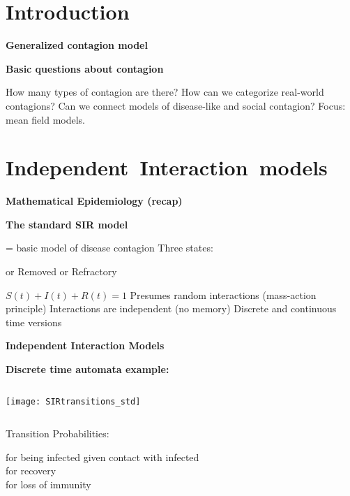 \section{Introduction}


  \textbf{Generalized contagion model}

  \textbf{Basic questions about contagion}
    
     How many types of contagion are there?
     How can we categorize real-world contagions?
     Can we connect models of disease-like and social contagion?
     \alert{Focus:} mean field models.
    
  


\section{Independent\ Interaction\ models}

  \textbf{Mathematical Epidemiology (recap)}

  \textbf{The standard \alert{SIR model}\cite{murray2002a}}
    
     = basic model of disease contagion
     Three states:
      
        { or Removed or Refractory}
      
       $S(t) + I(t) + R(t) = 1$
       Presumes random interactions (mass-action principle)
       Interactions are independent (no memory)
       Discrete and continuous time versions
    
  



  \textbf{Independent Interaction Models}

  \textbf{Discrete time automata example:}
    \medskip
          \begin{column}{0.4\textwidth}
        \texttt{[image: SIRtransitions\_std]}
      \end{column}
      \begin{column}{0.5\textwidth}
        {Transition Probabilities:}

        \bigskip
        {\alertb{$\beta$} for being infected given contact with infected}\\
        { for recovery}\\
        {\alertb{$\rho$} for loss of immunity}\\
      \end{column}
      



